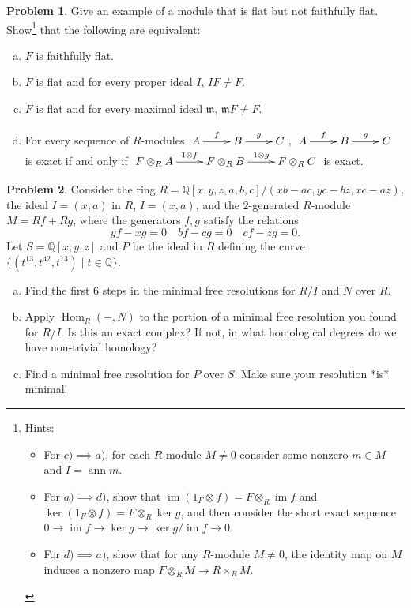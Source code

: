 \documentclass[11pt]{article}
\DeclareMathOperator{\Hom}{Hom}
\DeclareMathOperator{\im}{im}
\newcommand{\m}{\mathfrak{m}}
\DeclareMathOperator{\ann}{ann}
\theoremstyle{definition}
\newtheorem{problem}{Problem}
\begin{document}
\begin{problem} Give an example of a module that is flat but not faithfully flat. Show\footnote{Hints: \begin{itemize}
	\item For $c) \implies a)$, for each $R$-module $M \neq 0$ consider some nonzero $m \in M$ and $I = \ann m$. 
	\item For $a) \implies d)$, show that $\im(1_F \otimes f) = F \otimes_R \im f$ and $\ker(1_F \otimes f) = F \otimes_R \ker g$, and then consider the short exact sequence $0 \longrightarrow \im f \longrightarrow \ker g \longrightarrow \ker g/\im f \longrightarrow 0$. 
	\item For $d) \implies a)$, show that for any $R$-module $M \neq 0$, the identity map on $M$ induces a nonzero map $F \otimes_R M \longrightarrow R \times_R M$.
\end{itemize}}
 that the following are equivalent:	
\begin{enumerate}[a)]
		\item $F$ is faithfully flat.
		\item $F$ is flat and for every proper ideal $I$, $IF \neq F$.
		\item $F$ is flat and for every maximal ideal $\m$, $\m F \neq F$.
		\item For every sequence of $R$-modules $\xymatrix{A \ar[r]^-f & B \ar[r]^-g & C}$, $\xymatrix{A \ar[r]^-f & B \ar[r]^-g & C}$ is exact if and only if $\xymatrix{F \otimes_R A \ar[r]^-{1 \otimes f} & F \otimes_R B \ar[r]^-{1 \otimes g} & F \otimes_R C}$ is exact.
	\end{enumerate}
\end{problem}

\vspace{2em}

\begin{problem}
	Consider the ring $R = \mathbb{Q}[x,y,z,a,b,c]/(xb-ac,yc-bz,xc-az)$, the ideal $I = (x,a)$ in $R$, $I = (x,a)$, and the $2$-generated $R$-module $M = Rf + Rg$, where the generators $f, g$ satisfy the relations 
		$$yf-xg = 0 \quad bf - cg = 0 \quad cf - zg = 0.$$
		Let $S = \mathbb{Q}[x,y,z]$ and $P$ be the ideal in $R$ defining the curve $\lbrace (t^{13},t^{42},t^{73}) \mid t \in \mathbb{Q} \rbrace$.
		\begin{enumerate}[a)]
			\item Find the first $6$ steps in the minimal free resolutions for $R/I$ and $N$ over $R$.
			\item Apply $\Hom_R(-,N)$ to the portion of a minimal free resolution you found for $R/I$. Is this an exact complex? If not, in what homological degrees do we have non-trivial homology? 
			\item Find a minimal free resolution for $P$ over $S$. Make sure your resolution *is* minimal!
		\end{enumerate}
\end{problem}
\end{document}
